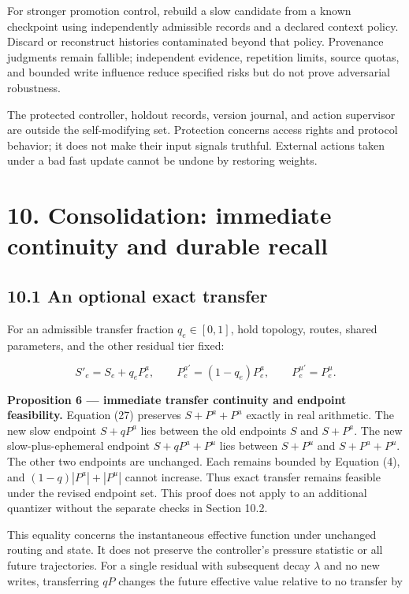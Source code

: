 \documentclass[
  11pt,
  a4paper,
]{article}
\begin{document}
For stronger promotion control, rebuild a slow candidate from a known
checkpoint using independently admissible records and a declared context
policy. Discard or reconstruct histories contaminated beyond that
policy. Provenance judgments remain fallible; independent evidence,
repetition limits, source quotas, and bounded write influence reduce
specified risks but do not prove adversarial robustness.

The protected controller, holdout records, version journal, and action
supervisor are outside the self-modifying set. Protection concerns
access rights and protocol behavior; it does not make their input
signals truthful. External actions taken under a bad fast update cannot
be undone by restoring weights.

\section{10. Consolidation: immediate continuity and durable
recall}\label{consolidation-immediate-continuity-and-durable-recall}

\subsection{10.1 An optional exact
transfer}\label{an-optional-exact-transfer}

For an admissible transfer fraction \(q_e\in[0,1]\), hold topology,
routes, shared parameters, and the other residual tier fixed:

\[
S'_e=S_e+q_eP_e^a,\qquad
P_e^{a\prime}=(1-q_e)P_e^a,\qquad
P_e^{u\prime}=P_e^u.
\tag{27}
\]

\textbf{Proposition 6 --- immediate transfer continuity and endpoint
feasibility.} Equation (27) preserves \(S+P^a+P^u\) exactly in real
arithmetic. The new slow endpoint \(S+qP^a\) lies between the old
endpoints \(S\) and \(S+P^a\). The new slow-plus-ephemeral endpoint
\(S+qP^a+P^u\) lies between \(S+P^u\) and \(S+P^a+P^u\). The other two
endpoints are unchanged. Each remains bounded by Equation (4), and
\((1-q)|P^a|+|P^u|\) cannot increase. Thus exact transfer remains
feasible under the revised endpoint set. This proof does not apply to an
additional quantizer without the separate checks in Section 10.2.

This equality concerns the instantaneous effective function under
unchanged routing and state. It does not preserve the controller's
pressure statistic or all future trajectories. For a single residual
with subsequent decay \(\lambda\) and no new writes, transferring \(qP\)
changes the future effective value relative to no transfer by
\end{document}
